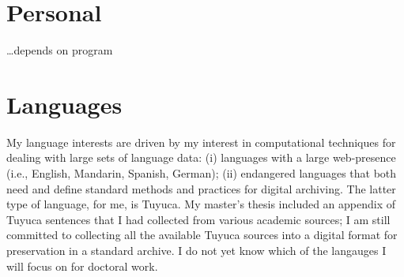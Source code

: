 \documentclass{article}
\begin{document}
\section{Personal}
\ldots depends on program   

\section{Languages}
My language interests are driven by my interest in computational techniques for dealing with large sets of language data: (i) languages with a large web-presence (i.e., English, Mandarin, Spanish, German); (ii) endangered languages that both need and define standard methods and practices for digital archiving. The latter type of language, for me, is Tuyuca. My master's thesis included an appendix of Tuyuca sentences that I had collected from various academic sources; I am still committed to collecting all the available Tuyuca sources into a digital format for preservation in a standard archive.
I do not yet know which of the langauges I will focus on for doctoral work.  
\end{document}
